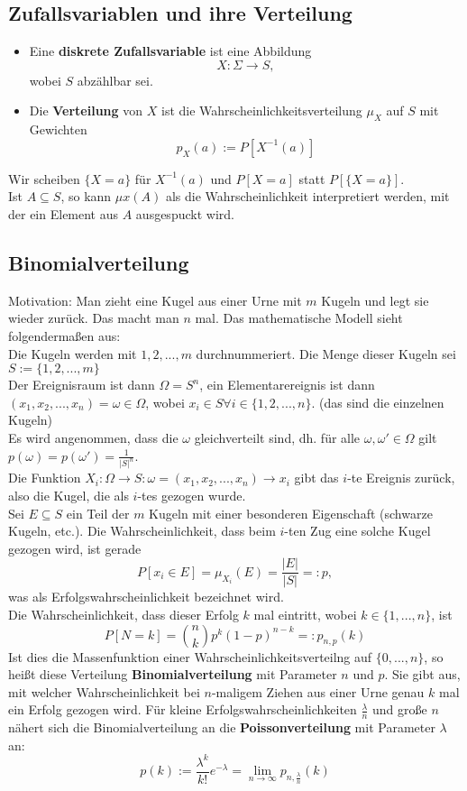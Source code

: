 \subsection{Zufallsvariablen und ihre Verteilung}
\begin{definition}
\begin{itemize}
\item Eine \textbf{diskrete Zufallsvariable} ist eine Abbildung
\[X:\Sigma \rightarrow S,\]
wobei $S$ abz\"ahlbar sei.
\item Die \textbf{Verteilung} von $X$ ist die Wahrscheinlichkeitsverteilung $\mu_X$ auf $S$ mit Gewichten
\[p_X(a):=P[X^{-1}(a)]\]
\end{itemize}
\end{definition}
\begin{bemerkung}
Wir scheiben $\{X=a\}$ f\"ur $X^{-1}(a)$ und $P[X=a]$ statt $P[\{X=a\}]$.\\
Ist $A\subseteq S$, so kann $\mu x(A)$ als die Wahrscheinlichkeit interpretiert werden, mit der ein Element aus $A$ ausgespuckt wird.
\end{bemerkung}
\subsection{Binomialverteilung}
Motivation: Man zieht eine Kugel aus einer Urne mit $m$ Kugeln und legt sie wieder zur\"uck. Das macht man $n$ mal. Das mathematische Modell sieht folgenderma\ss en aus:\\
Die Kugeln werden mit $1,2,...,m$ durchnummeriert. Die Menge dieser Kugeln sei $S:=\{1,2,...,m\}$\\
Der Ereignisraum ist dann $\Omega=S^n$, ein Elementarereignis ist dann $(x_1,x_2,...,x_n)=\omega\in\Omega$, wobei $x_i\in S\forall i\in\{1,2,...,n\}$. (das sind die einzelnen Kugeln)\\
Es wird angenommen, dass die $\omega$ gleichverteilt sind, dh. f\"ur alle $\omega,\omega'\in\Omega$ gilt $p(\omega)=p(\omega')=\frac 1{\lvert S\rvert^n}$.\\
Die Funktion $X_i:\Omega\rightarrow S:\omega=(x_1,x_2,...,x_n)\rightarrow x_i$ gibt das $i$-te Ereignis zur\"uck, also die Kugel, die als $i$-tes gezogen wurde.\\
Sei $E\subseteq S$ ein Teil der $m$ Kugeln mit einer besonderen Eigenschaft (schwarze Kugeln, etc.). Die Wahrscheinlichkeit, dass beim $i$-ten Zug eine solche Kugel gezogen wird, ist gerade
\[P[x_i\in E]=\mu_{X_i}(E)=\frac{\lvert E\rvert}{\lvert S\rvert}=:p,\]
was als Erfolgswahrscheinlichkeit bezeichnet wird.\\
Die Wahrscheinlichkeit, dass dieser Erfolg $k$ mal eintritt, wobei $k\in\{1,...,n\}$, ist
\[P[N=k]=\binom nkp^k(1-p)^{n-k}=:p_{n,p}(k)\]
Ist dies die Massenfunktion einer Wahrscheinlichkeitsverteilng auf $\{0,...,n\}$, so hei\ss t diese Verteilung \textbf{Binomialverteilung} mit Parameter $n$ und $p$. Sie gibt aus, mit welcher Wahrscheinlichkeit bei $n$-maligem Ziehen aus einer Urne genau $k$ mal ein Erfolg gezogen wird.
F\"ur kleine Erfolgswahrscheinlichkeiten $\frac\lambda n$ und gro\ss e $n$ n\"ahert sich die Binomialverteilung an die \textbf{Poissonverteilung} mit Parameter $\lambda$ an:
\[p(k):=\frac{\lambda^k}{k!}e^{-\lambda}=\lim_{n\rightarrow\infty}p_{n,\frac\lambda n}(k)\]
